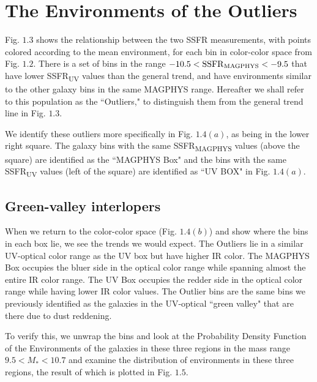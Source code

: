 \section{The Environments of the Outliers}
\label{ch1_results}
Fig. $1.3$ shows the relationship between the two SSFR measurements,
with points colored according to the mean environment, for each bin 
in color-color space from Fig. $1.2$. There is a set of bins in 
the range $-10.5 < \mathrm{SSFR\textsubscript{MAGPHYS}}< -9.5$ that 
have lower SSFR\textsubscript{UV} values than the general trend, 
and have environments similar to the other galaxy bins in the same 
MAGPHYS range. Hereafter we shall refer to this population as the 
``Outliers," to distinguish them from the general trend line in 
Fig. $1.3$. 

We identify these outliers more specifically in Fig. $1.4(a)$, as 
being in the lower right square. The galaxy bins with the same 
SSFR\textsubscript{MAGPHYS} values (above the square) are identified 
as the ``MAGPHYS Box" and the bins with the same SSFR\textsubscript{UV} 
values (left of the square) are identified as ``UV BOX" in Fig. 
$1.4(a)$. \\


  
\subsection{Green-valley interlopers}

When we return to the color-color space (Fig. $1.4(b)$) and 
show where the bins in each box lie, we see the trends we would expect. 
The Outliers lie in a similar UV-optical color range as the UV box but 
have higher IR color. The MAGPHYS Box occupies the bluer side 
in the optical color range while spanning almost the entire IR 
color range. The UV Box occupies the redder side in the optical 
color range while having lower IR color values. The Outlier bins 
are the same bins we previously identified as the galaxies in the 
UV-optical ``green valley" that are there due to dust reddening. 

To verify this, we unwrap the bins and look at the Probability 
Density Function of the Environments of the galaxies in these three regions 
in the mass range  $ 9.5 < M_{*} < 10.7$ and examine the distribution 
of environments in these three regions, the result of which is plotted in Fig. $1.5$.

